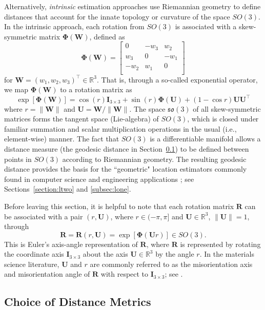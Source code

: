 \noindent Alternatively, \textit{intrinsic} estimation approaches use Riemannian geometry to define distances that account for the innate topology or curvature of the space $SO(3)$.  In the intrinsic approach, each rotation from $SO(3)$ is
associated with a skew-symmetric matrix $\bm{\Phi}(\bm{W})$, defined  as
\[
  \bm{\Phi}(\bm{W}) = \left[ \begin{array}{ccc} 0 & -w_3 & w_2\\
  w_3 & 0 & -w_1\\
 - w_2 & w_1 & 0\\
  \end{array}
 \right]
\]
for $\bm{W}=(w_1, w_2, w_3)^\top \in \mathbb{R}^3$. That is, through a so-called exponential operator,
we map  $\bm{\Phi}(\bm{W})$ to a rotation matrix as
\[
  \exp[\bm{\Phi}(\bm{W})] = \cos(r)\bm{I}_{3\times3} + \sin(r) \bm{\Phi}(\bm{U}) + (1-\cos r) \bm{U} \bm{U}^\top
\]
where $r=\|\bm{W}\|$ and $\bm{U} =\bm{W}/\|\bm{W}\| $.  The space $\mathfrak{so}(3)$ of all skew-symmetric matrices forms the tangent space (Lie-algebra) of $SO(3)$, which is closed under familiar summation and scalar multiplication operations in the usual (i.e., element-wise) manner. The fact that $SO(3)$ is a differentiable manifold allows a distance measure (the geodesic distance in Section~\ref{subsec:metrics}) to be defined between points in $SO(3)$ according to Riemannian geometry. The resulting geodesic distance provides the basis for the ``geometric" location estimators commonly found in computer science \citep{fletcher08, fletcher09, hartley11} and engineering applications \citep{manton04}; see Sections~\ref{section:ltwo} and \ref{subsec:lone}.

\noindent Before leaving this section, it is helpful to note that each rotation matrix $\bm{R}$ can be associated with a
pair $(r,\bm{U})$, where $r\in(-\pi,\pi]$ and $\bm{U}\in\mathbb{R}^3$, $\|\bm{U}\|=1$, through
\begin{equation}
\label{eqn:angleaxis}
 \bm{R} = \bm{R}(r,\bm{U}) = \exp[\bm\Phi(\bm{U} r)] \in SO(3).
\end{equation}
This is Euler's axis-angle representation of $\bm{R}$, where $\bm{R}$ is represented by rotating the coordinate axis $\bm{I}_{3 \times 3}$ about the axis $\bm{U}\in\mathbb{R}^3$ by the angle $r$. In the materials science literature,
$\bm{U}$ and $r$ are commonly referred to as the misorientation axis and misorientation angle of $\bm R$ with respect to  $\bm{I}_{3 \times 3}$; see \cite{randle03}.


\subsection{Choice of Distance Metrics}\label{subsec:metrics}

